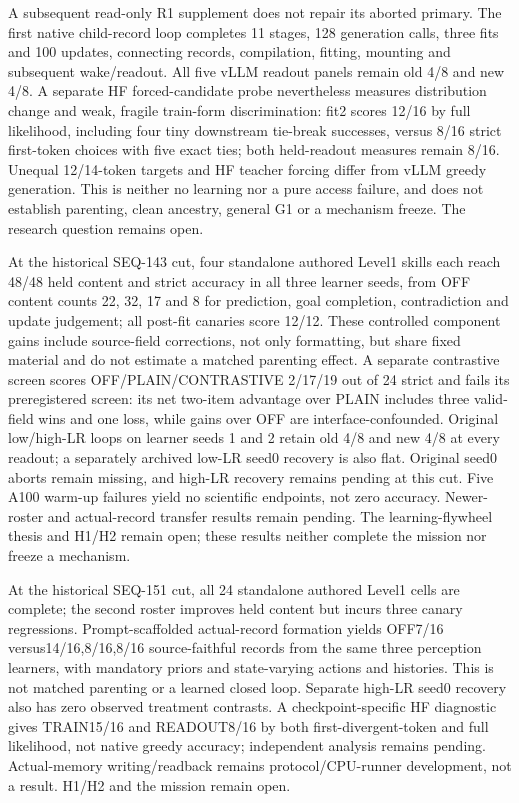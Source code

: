 \documentclass[11pt]{article}
\begin{document}
A subsequent read-only R1 supplement does not repair its aborted primary.
The first native child-record loop completes 11 stages, 128 generation calls,
three fits and 100 updates, connecting records, compilation, fitting, mounting
and subsequent wake/readout. All five vLLM readout panels remain old 4/8 and
new 4/8. A separate HF forced-candidate probe nevertheless measures distribution
change and weak, fragile train-form discrimination: fit2 scores 12/16 by full
likelihood, including four tiny downstream tie-break successes, versus 8/16
strict first-token choices with five exact ties; both held-readout measures
remain 8/16. Unequal 12/14-token targets and HF teacher forcing differ from
vLLM greedy generation. This is neither no learning nor a pure access failure,
and does not establish parenting, clean ancestry, general G1 or a mechanism
freeze. The research question remains open.

At the historical SEQ-143 cut, four standalone authored Level1 skills each reach 48/48 held
content and strict accuracy in all three learner seeds, from OFF content counts
22, 32, 17 and 8 for prediction, goal completion, contradiction and update
judgement; all post-fit canaries score 12/12. These controlled component gains
include source-field corrections, not only formatting, but share fixed material
and do not estimate a matched parenting effect. A separate contrastive screen
scores OFF/PLAIN/CONTRASTIVE 2/17/19 out of 24 strict and fails its preregistered
screen: its net two-item advantage over PLAIN includes three valid-field wins
and one loss, while gains over OFF are interface-confounded. Original low/high-LR
loops on learner seeds 1 and 2 retain old 4/8 and new 4/8 at every readout;
a separately archived low-LR seed0 recovery is also flat. Original seed0 aborts
remain missing, and high-LR recovery remains pending at this cut. Five A100
warm-up failures yield no scientific endpoints, not zero accuracy. Newer-roster
and actual-record transfer results remain pending. The learning-flywheel thesis
and H1/H2 remain open; these results neither complete the mission nor freeze a
mechanism.

At the historical SEQ-151 cut, all 24 standalone authored Level1 cells are complete;
the second roster improves held content but incurs three canary regressions.
Prompt-scaffolded actual-record formation yields OFF7/16 versus14/16,8/16,8/16
source-faithful records from the same three perception learners, with mandatory
priors and state-varying actions and histories. This is not matched parenting or
a learned closed loop. Separate high-LR seed0 recovery also has zero observed
treatment contrasts. A checkpoint-specific HF diagnostic gives TRAIN15/16 and
READOUT8/16 by both first-divergent-token and full likelihood, not native greedy accuracy;
independent analysis remains pending. Actual-memory writing/readback remains
protocol/CPU-runner development, not a result. H1/H2 and the mission remain open.
\end{document}
